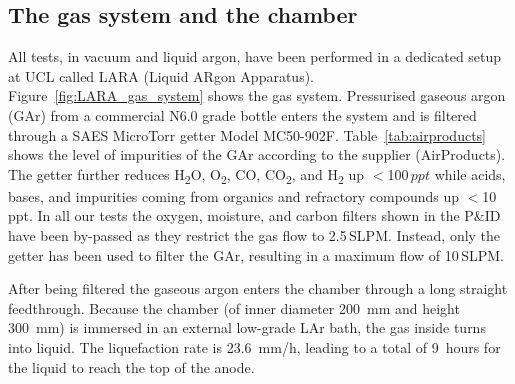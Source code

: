 \documentclass[a4paper,11pt]{article}
\begin{document}
\subsection{The gas system and the chamber}
All tests, in vacuum and liquid argon, have been performed in a dedicated setup at UCL called LARA (Liquid ARgon Apparatus). 
Figure~\ref{fig:LARA_gas_system} shows the gas system. Pressurised gaseous argon (GAr) from a commercial N6.0 grade bottle enters the system and is filtered through a SAES MicroTorr getter Model MC50-902F. Table~\ref{tab:airproducts} shows the level of impurities of the GAr according to the supplier (AirProducts). The getter further reduces H\textsubscript{2}O, O\textsubscript{2}, CO, CO\textsubscript{2}, and H\textsubscript{2} up $<$100\,$ppt$ while acids, bases, and impurities coming from organics and refractory compounds up $<$10\,ppt. In all our tests the oxygen, moisture, and carbon filters shown in the P\&ID have been by-passed as they restrict the gas flow to 2.5\,SLPM. Instead, only the getter has been used to filter the GAr, resulting in a maximum flow of 10\,SLPM. 

After being filtered the gaseous argon enters the chamber through a long straight feedthrough. Because the chamber (of inner diameter \SI{200}{\mm} and height \SI{300}{\mm}) is immersed in an external low-grade LAr bath, the gas inside turns into liquid. 
The liquefaction rate is \SI{23.6}{mm/h}, leading to a total of \SI{9}{hours} for the liquid to reach the top of the anode.
\end{document}
